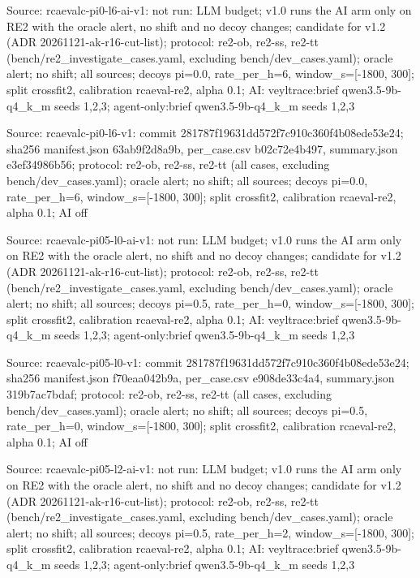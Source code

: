 \noindent Source: rcaevalc-pi0-l6-ai-v1: not run: LLM budget; v1.0 runs the AI arm only on RE2 with the oracle alert, no shift and no decoy changes; candidate for v1.2 (ADR 20261121-ak-r16-cut-list); protocol: re2-ob, re2-ss, re2-tt (bench/\allowbreak{}re2\_investigate\_cases.yaml, excluding bench/\allowbreak{}dev\_cases.yaml); oracle alert; no shift; all sources; decoys pi=0.0, rate\_per\_h=6, window\_s=[-1800, 300]; split crossfit2, calibration rcaeval-re2, alpha 0.1; AI: veyltrace:brief qwen3.5-9b-q4\_k\_m seeds 1,2,3; agent-only:brief qwen3.5-9b-q4\_k\_m seeds 1,2,3\par
\noindent Source: rcaevalc-pi0-l6-v1: commit 281787f19631dd572f7c910c360f4b08ede53e24; sha256 manifest.json 63ab9f2d8a9b, per\_case.csv b02c72e4b497, summary.json e3ef34986b56; protocol: re2-ob, re2-ss, re2-tt (all cases, excluding bench/\allowbreak{}dev\_cases.yaml); oracle alert; no shift; all sources; decoys pi=0.0, rate\_per\_h=6, window\_s=[-1800, 300]; split crossfit2, calibration rcaeval-re2, alpha 0.1; AI off\par
\noindent Source: rcaevalc-pi05-l0-ai-v1: not run: LLM budget; v1.0 runs the AI arm only on RE2 with the oracle alert, no shift and no decoy changes; candidate for v1.2 (ADR 20261121-ak-r16-cut-list); protocol: re2-ob, re2-ss, re2-tt (bench/\allowbreak{}re2\_investigate\_cases.yaml, excluding bench/\allowbreak{}dev\_cases.yaml); oracle alert; no shift; all sources; decoys pi=0.5, rate\_per\_h=0, window\_s=[-1800, 300]; split crossfit2, calibration rcaeval-re2, alpha 0.1; AI: veyltrace:brief qwen3.5-9b-q4\_k\_m seeds 1,2,3; agent-only:brief qwen3.5-9b-q4\_k\_m seeds 1,2,3\par
\noindent Source: rcaevalc-pi05-l0-v1: commit 281787f19631dd572f7c910c360f4b08ede53e24; sha256 manifest.json f70eaa042b9a, per\_case.csv e908de33c4a4, summary.json 319b7ac7bdaf; protocol: re2-ob, re2-ss, re2-tt (all cases, excluding bench/\allowbreak{}dev\_cases.yaml); oracle alert; no shift; all sources; decoys pi=0.5, rate\_per\_h=0, window\_s=[-1800, 300]; split crossfit2, calibration rcaeval-re2, alpha 0.1; AI off\par
\noindent Source: rcaevalc-pi05-l2-ai-v1: not run: LLM budget; v1.0 runs the AI arm only on RE2 with the oracle alert, no shift and no decoy changes; candidate for v1.2 (ADR 20261121-ak-r16-cut-list); protocol: re2-ob, re2-ss, re2-tt (bench/\allowbreak{}re2\_investigate\_cases.yaml, excluding bench/\allowbreak{}dev\_cases.yaml); oracle alert; no shift; all sources; decoys pi=0.5, rate\_per\_h=2, window\_s=[-1800, 300]; split crossfit2, calibration rcaeval-re2, alpha 0.1; AI: veyltrace:brief qwen3.5-9b-q4\_k\_m seeds 1,2,3; agent-only:brief qwen3.5-9b-q4\_k\_m seeds 1,2,3\par
